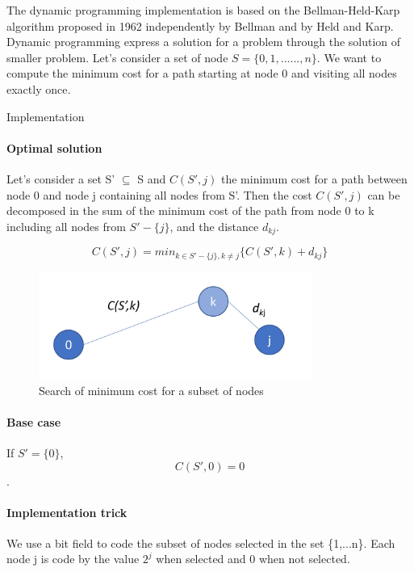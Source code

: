 \documentclass[../report.tex]{subfiles}
\begin{document}
The dynamic programming implementation is based on the Bellman-Held-Karp algorithm  proposed in 1962 independently by Bellman \cite{Bellman1962} and by Held and Karp.
\newline{}
Dynamic programming express a solution for a problem through the solution of smaller problem.
\newline{}
Let's consider a set of node $S=\{0,1,......,n\}$. We want to compute the minimum cost for a path starting at node 0 and visiting all nodes exactly once.


\begin{subsection}{Implementation}
\paragraph{Optimal solution}\hfill \break
Let's consider a set S' $\subseteq$ S and $C(S',j)$ the minimum cost for a path between node 0 and node j containing all nodes from S'. Then the cost $C(S',j)$ can be decomposed in the sum of the minimum cost of the path from node 0 to k including all nodes from $S'-\{j\}$, and the distance $d_{kj}$.

$$C(S',j)=min_{k \in S'-\{j\}, k \ne j}\{C(S',k)+d_{kj}\}$$

\begin{figure}[H]
\centering
\includegraphics[height=3.5cm,valign=t]{dp_graphalgo.jpg}
\caption{Search of minimum cost for a subset of nodes \label{fig:dpgraphalgo}}
\end{figure}

\paragraph{Base case}\hfill \break
If $S'=\{0\}$, $$C(S',0)=0$$.

\paragraph{Implementation trick}\hfill \break
We use a bit field to code the subset of nodes selected in the set \{1,...n\}.
Each node j is code by the value $2^j$ when selected and 0 when not selected. 
\end{subsection}
\end{document}
